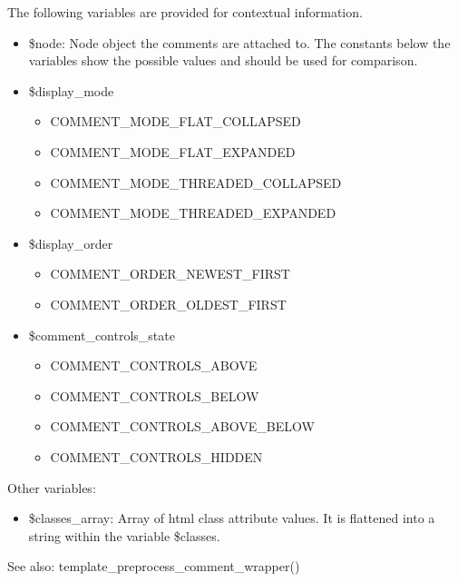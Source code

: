The following variables are provided for contextual information.\begin{itemize}
\item \$node: Node object the comments are attached to. The constants below the variables show the possible values and should be used for comparison.\item \$display\_\-mode\begin{itemize}
\item COMMENT\_\-MODE\_\-FLAT\_\-COLLAPSED\item COMMENT\_\-MODE\_\-FLAT\_\-EXPANDED\item COMMENT\_\-MODE\_\-THREADED\_\-COLLAPSED\item COMMENT\_\-MODE\_\-THREADED\_\-EXPANDED\end{itemize}
\item \$display\_\-order\begin{itemize}
\item COMMENT\_\-ORDER\_\-NEWEST\_\-FIRST\item COMMENT\_\-ORDER\_\-OLDEST\_\-FIRST\end{itemize}
\item \$comment\_\-controls\_\-state\begin{itemize}
\item COMMENT\_\-CONTROLS\_\-ABOVE\item COMMENT\_\-CONTROLS\_\-BELOW\item COMMENT\_\-CONTROLS\_\-ABOVE\_\-BELOW\item COMMENT\_\-CONTROLS\_\-HIDDEN\end{itemize}
\end{itemize}


Other variables:\begin{itemize}
\item \$classes\_\-array: Array of html class attribute values. It is flattened into a string within the variable \$classes.\end{itemize}


\begin{Desc}
\item[See also:]template\_\-preprocess\_\-comment\_\-wrapper() \end{Desc}
